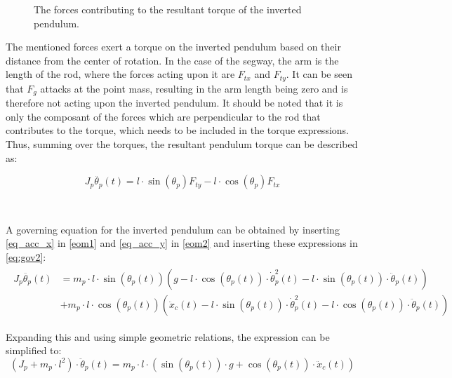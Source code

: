 \begin{figure}[H]
\centering
\scalebox{0.6}{}
%
\caption{The forces contributing to the resultant torque of the inverted pendulum.}
\label{torqueDeriviation}
\end{figure}

The mentioned forces exert a torque on the inverted pendulum based on their distance from the center of rotation. In the case of the segway, the arm is the length of the rod, where the forces acting upon it are $F_{tx}$ and $F_{ty}$. It can be seen that $F_g$ attacks at the point mass, resulting in the arm length being zero and is therefore not acting upon the inverted pendulum. 
It should be noted that it is only the composant of the forces which are perpendicular to the rod that contributes to the torque, which needs to be included in the torque expressions. 
Thus, summing over the torques, the resultant pendulum torque can be described as:

\begin{equation}
J_p \ddot{\theta_p}(t) =  l \cdot \sin(\theta_p) F_{ty}-l \cdot \cos(\theta_p) F_{tx} \label{eq:gov2}
\end{equation}
\begin{where}
\\
\end{where}

A governing equation for the inverted pendulum can be obtained by inserting \autoref{eq_acc_x} in \autoref{eom1} and \autoref{eq_acc_y} in \autoref{eom2} and inserting these expressions in \autoref{eq:gov2}:
\begin{align}
\begin{split}
J_p \ddot{\theta_p}(t) &= m_p \cdot l \cdot \sin(\theta_p(t))\left(g -l \cdot \cos(\theta_p(t))\cdot \dot \theta_p^2(t) - l \cdot \sin(\theta_p(t)) \cdot \ddot \theta_p(t)\right)\\&+m_p \cdot l \cdot \cos(\theta_p(t))\left(\ddot x_c(t) - l \cdot \sin(\theta_p(t))\cdot \dot \theta_p^2(t) - l \cdot \cos(\theta_p(t)) \cdot \ddot \theta_p(t)\right)
\end{split}
\end{align}

Expanding this and using simple geometric relations, the expression can be simplified to:
\begin{equation}
(J_p+m_p\cdot l^2)\cdot \ddot \theta_p(t) = m_p \cdot l \cdot \left(\sin(\theta_p(t)) \cdot g+ \cos(\theta_p(t)) \cdot \ddot x_c(t)\right) \label{eq:inertia1}
\end{equation}

